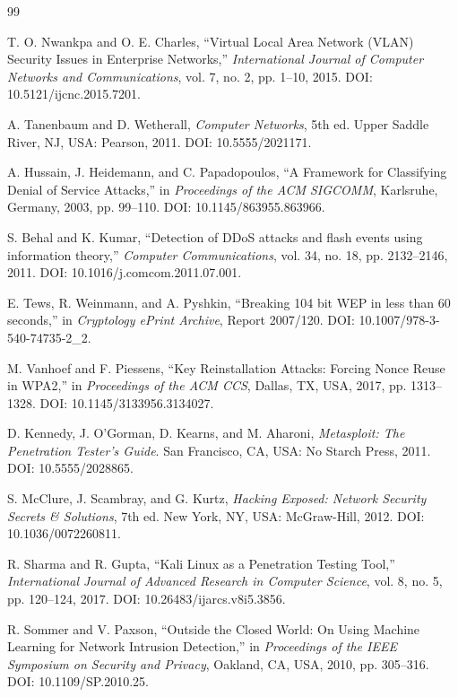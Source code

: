 \begin{thebibliography}{99}

T. O. Nwankpa and O. E. Charles, ``Virtual Local Area Network (VLAN) Security Issues in Enterprise Networks,'' 
\textit{International Journal of Computer Networks and Communications}, vol. 7, no. 2, pp. 1--10, 2015.  
DOI: 10.5121/ijcnc.2015.7201.

A. Tanenbaum and D. Wetherall, 
\textit{Computer Networks}, 5th ed. Upper Saddle River, NJ, USA: Pearson, 2011.  
DOI: 10.5555/2021171.

A. Hussain, J. Heidemann, and C. Papadopoulos, ``A Framework for Classifying Denial of Service Attacks,'' 
in \textit{Proceedings of the ACM SIGCOMM}, Karlsruhe, Germany, 2003, pp. 99--110.  
DOI: 10.1145/863955.863966.

S. Behal and K. Kumar, ``Detection of DDoS attacks and flash events using information theory,'' 
\textit{Computer Communications}, vol. 34, no. 18, pp. 2132--2146, 2011.  
DOI: 10.1016/j.comcom.2011.07.001.

E. Tews, R. Weinmann, and A. Pyshkin, ``Breaking 104 bit WEP in less than 60 seconds,'' 
in \textit{Cryptology ePrint Archive}, Report 2007/120.  
DOI: 10.1007/978-3-540-74735-2\_2.

M. Vanhoef and F. Piessens, ``Key Reinstallation Attacks: Forcing Nonce Reuse in WPA2,'' 
in \textit{Proceedings of the ACM CCS}, Dallas, TX, USA, 2017, pp. 1313--1328.  
DOI: 10.1145/3133956.3134027.

D. Kennedy, J. O'Gorman, D. Kearns, and M. Aharoni, 
\textit{Metasploit: The Penetration Tester’s Guide}. San Francisco, CA, USA: No Starch Press, 2011.  
DOI: 10.5555/2028865.

S. McClure, J. Scambray, and G. Kurtz, 
\textit{Hacking Exposed: Network Security Secrets \& Solutions}, 7th ed. New York, NY, USA: McGraw-Hill, 2012.  
DOI: 10.1036/0072260811.

R. Sharma and R. Gupta, ``Kali Linux as a Penetration Testing Tool,'' 
\textit{International Journal of Advanced Research in Computer Science}, vol. 8, no. 5, pp. 120--124, 2017.  
DOI: 10.26483/ijarcs.v8i5.3856.

R. Sommer and V. Paxson, ``Outside the Closed World: On Using Machine Learning for Network Intrusion Detection,'' 
in \textit{Proceedings of the IEEE Symposium on Security and Privacy}, Oakland, CA, USA, 2010, pp. 305--316.  
DOI: 10.1109/SP.2010.25.

\end{thebibliography}
